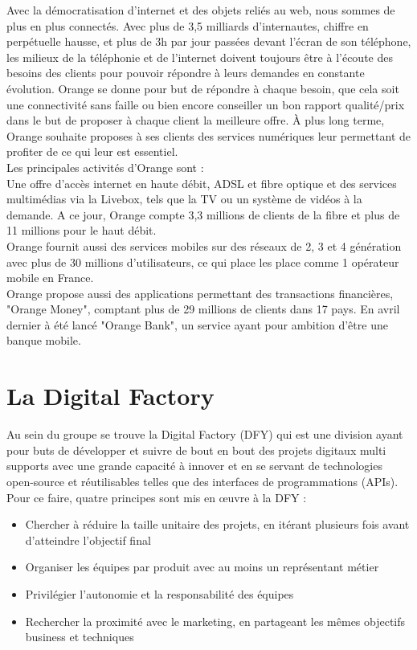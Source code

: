 Avec la démocratisation d'internet et des objets reliés au web, nous sommes de plus en plus connectés. Avec plus de 3,5 milliards d'internautes, chiffre en perpétuelle hausse, et plus de 3h par jour passées devant l'écran de son téléphone, les milieux de la téléphonie et de l'internet doivent toujours être à l'écoute des besoins des clients pour pouvoir répondre à leurs demandes en constante évolution. Orange se donne pour but de répondre à chaque besoin, que cela soit une connectivité sans faille ou bien encore conseiller un bon rapport qualité/prix dans le but de proposer à chaque client la meilleure offre. À plus long terme, Orange souhaite proposes à ses clients des services numériques leur permettant de profiter de ce qui leur est essentiel. \\
Les principales activités d'Orange sont :\\
Une offre d'accès internet en haute débit, ADSL et fibre optique et des services multimédias via la Livebox, tels que la TV ou un système de vidéos à la demande. A ce jour, Orange compte 3,3 millions de clients de la fibre et plus de 11 millions pour le haut débit.\\
Orange fournit aussi des services mobiles sur des réseaux de 2, 3 et 4 génération avec plus de 30 millions d'utilisateurs, ce qui place les place comme 1 opérateur mobile en France.\\
Orange propose aussi des applications permettant des transactions financières, "Orange Money", comptant plus de 29 millions de clients dans 17 pays. En avril dernier à été lancé "Orange Bank", un service ayant pour ambition d'être une banque mobile.


\section{La Digital Factory}

Au sein du groupe se trouve la Digital Factory (DFY) qui est une division ayant pour buts de développer et suivre de bout en bout des projets digitaux multi supports avec une grande capacité à innover et en se servant de technologies open-source et réutilisables telles que des interfaces de programmations (APIs). Pour ce faire, quatre principes sont mis en \oe{}uvre à la DFY :

\begin{itemize}
    \item Chercher à réduire la taille unitaire des projets, en itérant plusieurs fois avant 	d’atteindre l’objectif final
    \item Organiser les équipes par produit avec au moins un représentant métier
    \item Privilégier l’autonomie et la responsabilité des équipes
    \item Rechercher la proximité avec le marketing, en partageant les mêmes objectifs business et techniques
\end{itemize}

